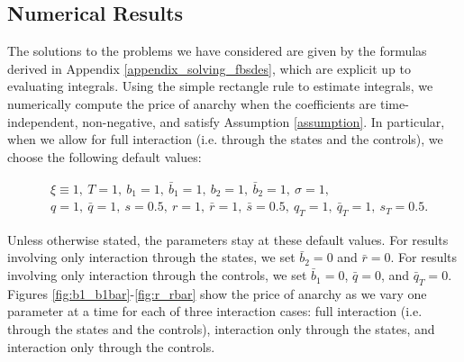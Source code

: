 \documentclass[11pt]{article}
\begin{document}
\subsection{\textbf{Numerical Results}}
The solutions to the problems we have considered are given by the formulas derived in Appendix \ref{appendix_solving_fbsdes}, which are explicit up to evaluating integrals. Using the simple rectangle rule to estimate integrals, we numerically compute the price of anarchy when the coefficients are time-independent, non-negative, and satisfy Assumption \ref{assumption}. In particular, when we allow for full interaction (i.e. through the states and the controls), we choose the following default values:

\begin{equation*}
\begin{split}
    &\xi\equiv 1,\ T=1,\ b_1=1,\  \bar{b}_1=1,\ b_2=1,\ \bar{b}_2=1,\ \sigma=1, \\
    &q=1,\ \bar{q}=1,\ s=0.5,\ r=1,\ \bar{r}=1,\ \bar{s}=0.5,\ q_T=1,\  \bar{q}_T=1,\ s_T=0.5.
\end{split}
\end{equation*}

Unless otherwise stated, the parameters stay at these default values. For results involving only interaction through the states, we set $\bar{b}_2=0$ and $\bar{r}=0$. For results involving only interaction through the controls, we set $\bar{b}_1=0$, $\bar{q}=0$, and $\bar{q}_T=0$. Figures \ref{fig:b1_b1bar}-\ref{fig:r_rbar} show the price of anarchy as we vary one parameter at a time for each of three interaction cases: full interaction (i.e. through the states and the controls), interaction only through the states, and interaction only through the controls.
\end{document}
